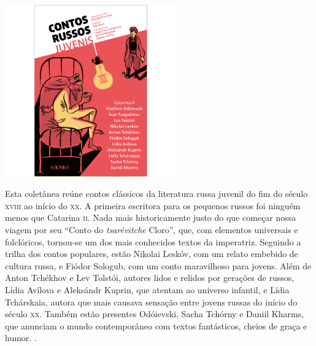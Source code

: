 \pagestyle{kalinka}
\label{kalinka}

\pagebreak 

\begin{center}
\hspace*{-3.6cm}
\hspace*{3.1cm}\includegraphics[width=74mm]{./grid/contos.jpg}
\end{center}

\hspace*{-7cm}\hrulefill\hspace*{-7cm}

\medskip

\noindent{}Esta coletânea reúne contos clássicos da literatura russa juvenil do fim do século \textsc{xviii} ao início do \textsc{xx}. A primeira escritora para os pequenos russos foi ninguém menos que Catarina \textsc{ii}. Nada mais historicamente justo do que começar nossa viagem por seu ``Conto do \textit{tsarévitche} Cloro'', que, com elementos universais e folclóricos, tornou-se um dos mais conhecidos textos da imperatriz. Seguindo a trilha dos contos populares, estão Nikolai Leskóv, com um relato embebido de cultura russa, e Fiódor Sologub, com um conto maravilhoso para jovens. Além de Anton Tchékhov e Lev Tolstói, autores lidos e relidos por gerações de russos, Lídia Avílova e Aleksándr Kuprin, que atentam ao universo infantil, e Lídia Tchárskaia, autora que mais causava sensação entre jovens russas do início do século \textsc{xx}. Também estão presentes Odóievski, Sacha Tchórny e Daniil Kharms, que anunciam o mundo contemporâneo com textos fantásticos, cheios de graça e humor. .

